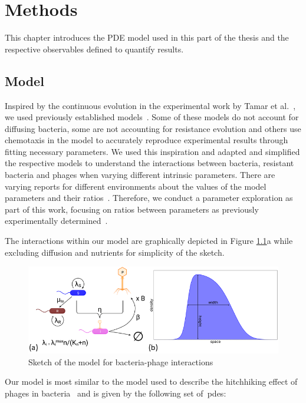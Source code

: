 \chapter{Methods}
\label{chap:phage_methods}

This chapter introduces the PDE model used in this part of the thesis and the respective observables defined to quantify results.

\section{Model}
Inspired by the continuous evolution in the experimental work by Tamar et al.~\cite{Shaer-Tamar2022-cq}, we used previously established models~\cite{Ping2020-vd, Wang2024, Smith2011, Yin1992}. Some of these models do not account for diffusing bacteria, some are not accounting for resistance evolution and others use chemotaxis in the model to accurately reproduce experimental results through fitting necessary parameters. We used this inspiration and adapted and simplified the respective models to understand the interactions between bacteria, resistant bacteria and phages when varying different intrinsic parameters.
There are varying reports for different environments about the values of the model parameters and their ratios~\cite{Eriksen2020-zp, Ping2020-vd}.
Therefore, we conduct a parameter exploration as part of this work, focusing on ratios between parameters as previously experimentally determined~\cite{Tavaddod2011, Moldovan2007, Payne2018}.

The interactions within our model are graphically depicted in Figure \ref{fig:model_sketch}a while excluding diffusion and nutrients for simplicity of the sketch.

\begin{figure}
\centering
\includegraphics[width=\linewidth]{graphics/2025_09_26_droplets_fig1.png}
\caption{Sketch of the model for bacteria-phage interactions}
\label{fig:model_sketch}
\end{figure}

Our model is most similar to the model used to describe the hitchhiking effect of phages in bacteria~\cite{Ping2020-vd} and is given by the following set of~\gls{pde}s:

